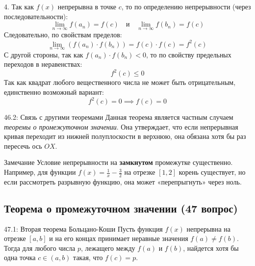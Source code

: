\documentclass[a4paper,12pt]{article}
\begin{document}
	4. Так как $f(x)$ непрерывна в точке $c$, то по определению непрерывности (через последовательности):
	$$ \lim_{n \to \infty} f(a_n) = f(c) \quad \text{и} \quad \lim_{n \to \infty} f(b_n) = f(c) $$
	Следовательно, по свойствам пределов:
	$$ \lim_{n \to \infty} (f(a_n) \cdot f(b_n)) = f(c) \cdot f(c) = f^2(c) $$
	С другой стороны, так как $f(a_n) \cdot f(b_n) < 0$, то по свойству предельных переходов в неравенствах:
	$$ f^2(c) \leq 0 $$
	Так как квадрат любого вещественного числа не может быть отрицательным, единственно возможный вариант:
	$$ f^2(c) = 0 \implies f(c) = 0 $$

	
	\begin{notebook}{46.2: Связь с другими теоремами}
		Данная теорема является частным случаем \textit{теоремы о промежуточном значении}. Она утверждает, что если непрерывная кривая переходит из нижней полуплоскости в верхнюю, она обязана хотя бы раз пересечь ось $OX$.
	\end{notebook}
	
	\begin{importantbox}{Замечание}
		Условие непрерывности на \textbf{замкнутом} промежутке существенно. 
		Например, для функции $f(x) = \frac{1}{x} - \frac{3}{2}$ на отрезке $[1, 2]$ корень существует, но если рассмотреть разрывную функцию, она может «перепрыгнуть» через ноль.
	\end{importantbox}
	
	
	
	

	\subsection{Теорема о промежуточном значении (47 вопрос)}
	
	\begin{theorembox}{47.1: Вторая теорема Больцано-Коши}
		Пусть функция $f(x)$ непрерывна на отрезке $[a, b]$ и на его концах принимает неравные значения $f(a) \neq f(b)$. 
		Тогда для любого числа $p$, лежащего между $f(a)$ и $f(b)$, найдется хотя бы одна точка $c \in (a, b)$ такая, что $f(c) = p$.
	\end{theorembox}
	
	\begin{center}
	\end{center}
	
\end{document}
